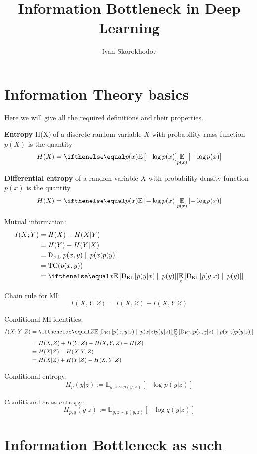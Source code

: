 \documentclass{article}
\title{Information Bottleneck in Deep Learning}
\author{Ivan Skorokhodov}
\begin{document}

\section{Information Theory basics}
Here we will give all the required definitions and their properties.

\begin{definition}
\textbf{Entropy} H(X) of a discrete random variable $X$ with probability mass function $p(X)$ is the quantity
\[
H(X) = \expect[p(x)]{-\log p(x)}
\]
\end{definition}

\begin{definition}
\textbf{Differential entropy} of a random variable $X$ with probability density function $p(x)$ is the quantity
\[
H(X) = \expect[p(x)]{-\log p(x)}
\]
\end{definition}

Mutual information:
\[
\begin{split}
I(X;Y)
&= H(X) - H(X|Y) \\
&= H(Y) - H(Y|X) \\
&= \kl{p(x,y)}{p(x)p(y)} \\
&= \text{TC}(p(x,y)) \\
&= \expect[x]{\kl{p(y|x)}{p(y)}}
\end{split}
\]

Chain rule for MI:
\[
I(X ; Y, Z)=I(X ; Z) + I(X ; Y | Z)
\]

Conditional MI identities:
\[
\begin{split}
I(X ; Y|Z)
&= \expect[Z]{\kl{p(x,y|z)}{p(x|z)p(y|z)}} \\
&= H(X, Z) + H(Y, Z) - H(X, Y, Z) - H(Z) \\
&= H(X|Z) - H(X|Y, Z) \\
&= H(X|Z) + H(Y|Z) - H(X, Y|Z) \\
\end{split}
\]

Conditional entropy:
\[
H_{p}(y | z) :=\mathbb{E}_{y, z \sim p(y, z)}[-\log p(y | z)]
\]

Conditional cross-entropy:
\[
H_{p, q}(y | z) := \mathbb{E}_{y, z \sim p(y, z)}[-\log q(y | z)]
\]


\section{Information Bottleneck as such}
\end{document}
